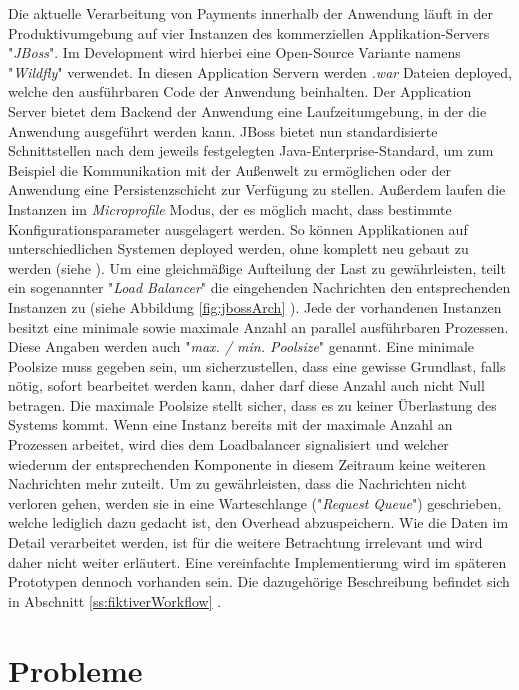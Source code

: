 \label{sec:loadbalancer}
Die aktuelle Verarbeitung von Payments innerhalb der Anwendung läuft in der Produktivumgebung auf vier Instanzen des kommerziellen Applikation-Servers "\emph{JBoss}". Im Development wird hierbei eine Open-Source Variante namens "\emph{Wildfly}" verwendet. In diesen Application Servern werden \emph{.war} Dateien deployed, welche den ausführbaren Code der Anwendung beinhalten. Der Application Server bietet dem Backend der Anwendung eine Laufzeitumgebung, in der die Anwendung ausgeführt werden kann. JBoss bietet nun standardisierte Schnittstellen nach dem jeweils festgelegten Java-Enterprise-Standard, um zum Beispiel die Kommunikation mit der Außenwelt zu ermöglichen oder der Anwendung eine Persistenzschicht zur Verfügung zu stellen. Außerdem laufen die Instanzen im \emph{Microprofile} Modus, der es möglich macht, dass bestimmte Konfigurationsparameter ausgelagert werden. So können Applikationen auf unterschiedlichen Systemen deployed werden, ohne komplett neu gebaut zu werden (siehe \cite{microprofile}). Um eine gleichmäßige Aufteilung der Last zu gewährleisten, teilt ein sogenannter "\emph{Load Balancer}" die eingehenden Nachrichten den entsprechenden Instanzen zu (siehe Abbildung \ref{fig:jbossArch} ). Jede der vorhandenen Instanzen besitzt eine minimale sowie maximale Anzahl an parallel ausführbaren Prozessen. Diese Angaben werden auch "\emph{max. / min. Poolsize}" genannt. Eine minimale Poolsize muss gegeben sein, um sicherzustellen, dass eine gewisse Grundlast, falls nötig, sofort bearbeitet werden kann, daher darf diese Anzahl auch nicht Null betragen. Die maximale Poolsize stellt sicher, dass es zu keiner Überlastung des Systems kommt. Wenn eine Instanz bereits mit der maximale Anzahl an Prozessen arbeitet, wird dies dem Loadbalancer signalisiert und welcher wiederum der entsprechenden Komponente in diesem Zeitraum keine weiteren Nachrichten mehr zuteilt. Um zu gewährleisten, dass die Nachrichten nicht verloren gehen, werden sie in eine Warteschlange ("\emph{Request Queue}") geschrieben, welche lediglich dazu gedacht ist, den Overhead abzuspeichern. Wie die Daten im Detail verarbeitet werden, ist für die weitere Betrachtung irrelevant und wird daher nicht weiter erläutert. Eine vereinfachte Implementierung wird im späteren Prototypen dennoch vorhanden sein. Die dazugehörige Beschreibung befindet sich in Abschnitt \ref{ss:fiktiverWorkflow} .


\section{Probleme}

